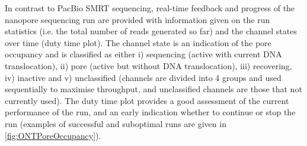\newpage
In contrast to PacBio SMRT sequencing, real-time feedback and progress of the nanopore sequencing run are provided with information given on the run statistics (i.e. the total number of reads generated so far) and the channel states over time (duty time plot). The channel state is an indication of the pore occupancy and is classified as either i) sequencing (active with current DNA translocation), ii) pore (active but without DNA translocation), iii) recovering, iv) inactive and v) unclassified (channels are divided into 4 groups and used sequentially to maximise throughput, and unclassified channels are those that not currently used). The duty time plot provides a good assessment of the current performance of the run, and an early indication whether to continue or stop the run (examples of successful and suboptimal runs are given in \cref{fig:ONTPoreOccupancy}). 

